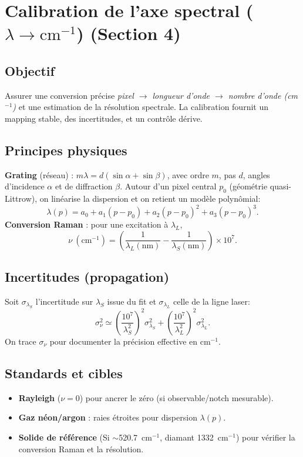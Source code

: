 
\section{Calibration de l'axe spectral (\texorpdfstring{$\lambda \rightarrow \mathrm{cm}^{-1}$}{lambda->cm-1}) (Section 4)}

\subsection{Objectif}
Assurer une conversion précise \emph{pixel $\rightarrow$ longueur d'onde $\rightarrow$ nombre d'onde (cm$^{-1}$)} et une estimation de la résolution spectrale. La calibration fournit un mapping stable, des incertitudes, et un contrôle dérive.

\subsection{Principes physiques}
\textbf{Grating} (réseau) : $m\lambda = d(\sin \alpha + \sin \beta)$, avec ordre $m$, pas $d$, angles d'incidence $\alpha$ et de diffraction $\beta$. Autour d'un pixel central $p_0$ (géométrie quasi-Littrow), on linéarise la dispersion et on retient un modèle polynômial:
\begin{equation}
\lambda(p) = a_0 + a_1 (p-p_0) + a_2 (p-p_0)^2 + a_3 (p-p_0)^3.
\end{equation}
\textbf{Conversion Raman} : pour une excitation à $\lambda_L$,
\begin{equation}
\nu~(\mathrm{cm}^{-1}) = \left(\frac{1}{\lambda_L(\mathrm{nm})} - \frac{1}{\lambda_S(\mathrm{nm})}\right) \times 10^7.
\end{equation}

\subsection{Incertitudes (propagation)}
Soit $\sigma_{\lambda_S}$ l'incertitude sur $\lambda_S$ issue du fit et $\sigma_{\lambda_L}$ celle de la ligne laser:
\begin{equation}
\sigma_{\nu}^2 \simeq \left(\frac{10^7}{\lambda_S^2}\right)^2 \sigma_{\lambda_S}^2 + \left(\frac{10^7}{\lambda_L^2}\right)^2 \sigma_{\lambda_L}^2.
\end{equation}
On trace $\sigma_{\nu}$ pour documenter la précision effective en cm$^{-1}$.

\subsection{Standards et cibles}
\begin{itemize}[nosep]
\item \textbf{Rayleigh} ($\nu=0$) pour ancrer le zéro (si observable/notch mesurable).
\item \textbf{Gaz néon/argon} : raies étroites pour dispersion $\lambda(p)$.
\item \textbf{Solide de référence} (Si $\sim$520.7~cm$^{-1}$, diamant 1332~cm$^{-1}$) pour vérifier la conversion Raman et la résolution.
\end{itemize}

